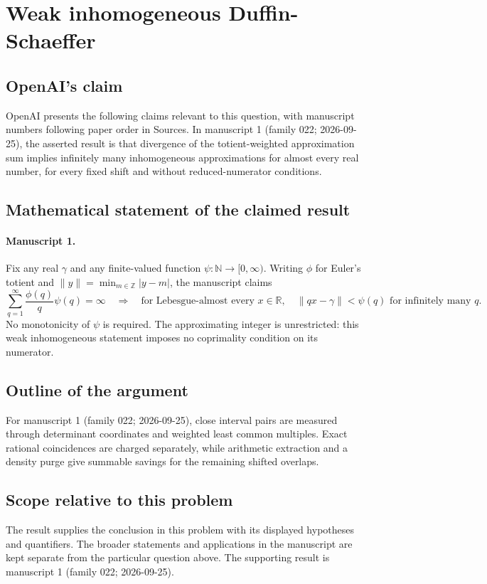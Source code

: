 \documentclass[11pt]{article}
\begin{document}
\section*{Weak inhomogeneous Duffin-Schaeffer}

\subsection{OpenAI's claim}
OpenAI presents the following claims relevant to this question, with manuscript numbers following paper order in Sources. In manuscript 1 (family 022; 2026-09-25), the asserted result is that divergence of the totient-weighted approximation sum implies infinitely many inhomogeneous approximations for almost every real number, for every fixed shift and without reduced-numerator conditions.

\subsection{Mathematical statement of the claimed result}
\paragraph{Manuscript 1.}
Fix any real $\gamma$ and any finite-valued function $\psi:\mathbb N\to[0,\infty)$. Writing $\phi$ for Euler's totient and $\|y\|=\min_{m\in\mathbb Z}|y-m|$, the manuscript claims
\[
 \sum_{q=1}^{\infty}\frac{\phi(q)}q\psi(q)=\infty
 \quad\Longrightarrow\quad
 \text{for Lebesgue-almost every }x\in\mathbb R,
 \quad\|qx-\gamma\|<\psi(q)\text{ for infinitely many }q.
\]
No monotonicity of $\psi$ is required. The approximating integer is unrestricted: this weak inhomogeneous statement imposes no coprimality condition on its numerator.

\subsection{Outline of the argument}
For manuscript 1 (family 022; 2026-09-25), close interval pairs are measured through determinant coordinates and weighted least common multiples. Exact rational coincidences are charged separately, while arithmetic extraction and a density purge give summable savings for the remaining shifted overlaps.

\subsection{Scope relative to this problem}
The result supplies the conclusion in this problem with its displayed hypotheses and quantifiers. The broader statements and applications in the manuscript are kept separate from the particular question above. The supporting result is manuscript 1 (family 022; 2026-09-25).
\end{document}
